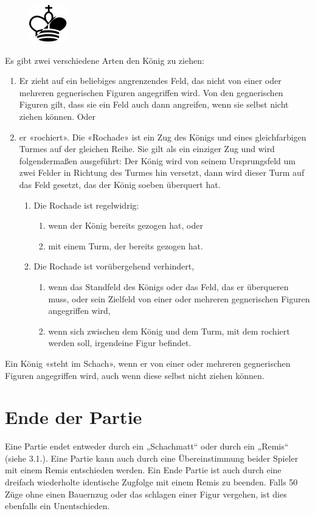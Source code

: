 \documentclass[a4paper, 10pt]{scrartcl}
\begin{document}
\begin{figure}
        \includegraphics[width=0.15\textwidth, right]{assets/king_split.png}
\end{figure}
Es gibt zwei verschiedene Arten den König zu ziehen:
\begin{enumerate}
        \item Er zieht auf ein beliebiges angrenzendes Feld, das nicht von einer oder mehreren gegnerischen Figuren angegriffen wird. Von den gegnerischen Figuren gilt, dass sie ein Feld auch dann angreifen, wenn sie selbst nicht ziehen können. Oder
        \item er «rochiert». Die «Rochade» ist ein Zug des Königs und eines gleichfarbigen Turmes auf der gleichen Reihe. Sie gilt als ein einziger Zug und wird folgendermaßen ausgeführt: Der König wird von seinem Ursprungsfeld um zwei Felder in Richtung des Turmes hin versetzt, dann wird dieser Turm auf das Feld gesetzt, das der König soeben überquert hat.
        \begin{enumerate}
                \item Die Rochade ist regelwidrig:
                \begin{enumerate}
                        \item wenn der König bereits gezogen hat, oder
                        \item mit einem Turm, der bereits gezogen hat.
                \end{enumerate}
                \item Die Rochade ist vorübergehend verhindert,
                \begin{enumerate}
                        \item wenn das Standfeld des Königs oder das Feld, das er überqueren muss, oder sein Zielfeld von einer oder mehreren gegnerischen Figuren angegriffen wird,
                        \item wenn sich zwischen dem König und dem Turm, mit dem rochiert werden soll, irgendeine Figur befindet.
                \end{enumerate}
        \end{enumerate}
\end{enumerate}
Ein König «steht im Schach», wenn er von einer oder mehreren gegnerischen Figuren angegriffen wird, auch wenn diese selbst nicht ziehen können.

\section{Ende der Partie}
Eine Partie endet entweder durch ein „Schachmatt“ oder durch ein „Remis“ (siehe 3.1.).
Eine Partie kann auch durch eine Übereinstimmung beider Spieler mit einem Remis entschieden werden. 
Ein Ende Partie ist auch durch eine dreifach wiederholte identische Zugfolge mit einem Remis zu beenden. 
Falls 50 Züge ohne einen Bauernzug oder das schlagen einer Figur vergehen, ist dies ebenfalls ein Unentschieden.
\end{document}
